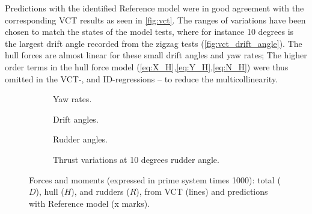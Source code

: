 Predictions with the identified Reference model were in good agreement with the corresponding VCT results as seen in \autoref{fig:vct}. The ranges of variations have been chosen to match the states of the model tests, where for instance 10 degrees is the largest drift angle recorded from the zigzag tests (\autoref{fig:vct_drift_angle}). The hull forces are almost linear for these small drift angles and yaw rates; The higher order terms in the hull force model (\autoref{eq:X_H},\autoref{eq:Y_H},\autoref{eq:N_H}) were thus omitted in the VCT-, and ID-regressions -- to reduce the multicollinearity.
\begin{figure}
     \centering
     \begin{subfigure}[b]{0.49\textwidth}
         \centering
         
         \caption{Yaw rates.}
         \label{fig:vct_circle}
     \end{subfigure}
     \hfill
     \begin{subfigure}[b]{0.49\textwidth}
         \centering
         
         \caption{Drift angles.}
         \label{fig:vct_drift_angle}
     \end{subfigure}
     \begin{subfigure}[b]{0.49\textwidth}
         \centering
         
         \caption{Rudder angles.}
         \label{fig:vct_rudder_angle}
     \end{subfigure}
     \hfill
     \begin{subfigure}[b]{0.49\textwidth}
         \centering
         
         \caption{Thrust variations at 10 degrees rudder angle.}
         \label{fig:vct_thrust_variation}
     \end{subfigure}
     \caption{Forces and moments (expressed in prime system times 1000): total ($D$), hull ($H$), and rudders ($R$), from VCT (lines) and predictions with Reference model (x marks).}
     \label{fig:vct}
\end{figure}